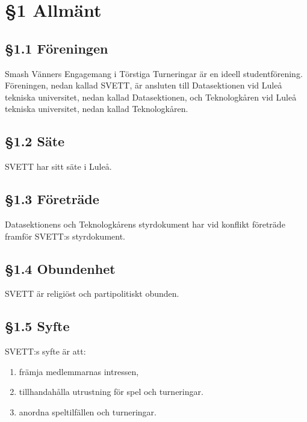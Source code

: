 \section*{\S1 Allmänt}

\subsection*{\S1.1 Föreningen}
{}

Smash Vänners Engagemang i Törstiga Turneringar är en ideell studentförening. Föreningen, nedan kallad
SVETT, är ansluten till Datasektionen vid Luleå tekniska universitet, nedan kallad
Datasektionen, och Teknologkåren vid Luleå tekniska universitet, nedan kallad
Teknologkåren.

\subsection*{\S1.2 Säte}

SVETT har sitt säte i Luleå.

\subsection*{\S1.3 Företräde}

Datasektionens och Teknologkårens styrdokument har vid konflikt företräde framför
SVETT:s styrdokument.

\subsection*{\S1.4 Obundenhet}

SVETT är religiöst och partipolitiskt obunden.

\subsection*{\S1.5 Syfte}

SVETT:s syfte är att:
\begin{enumerate}[label=\roman*)]
	\item främja medlemmarnas intressen,
	\item tillhandahålla utrustning för spel och turneringar.
	\item anordna speltilfällen och turneringar.
\end{enumerate}

